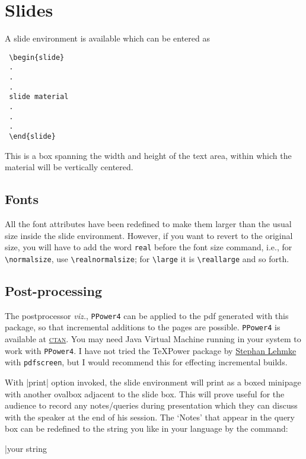 \documentclass[a4paper]{article}
\begin{document}
\section{Slides}

A slide environment is available which can be entered as
\begin{verbatim}
 \begin{slide}
 .
 .
 .
 slide material
 .
 .
 .
 \end{slide}
 \end{verbatim}
This is a box spanning the width and height of the text area, within
which the material will be vertically centered. 

\subsection{Fonts}
All the font attributes have been redefined to make them larger than
the usual size inside the slide environment. However, if you want to
revert to the original size, you will have to add the word \verb+real+
before the font size command, i.e., for \verb+\normalsize+, use
\verb+\realnormalsize+; for \verb+\large+ it is \verb+\reallarge+ and
so forth.

\subsection{Post-processing}

The postprocessor \emph{viz.}, \verb+PPower4+ can be applied to the pdf
generated with this package, so that incremental additions to the pages
are possible. \verb+PPower4+ is available at
\href{ftp://ftp.dante.de/support/PPower4}{\textsc{ctan}}. You may need
Java Virtual Machine running in your system to work with
\verb+PPower4+. I have not tried the \TeX{}Power package by
\href{mailto:Stephan.Lehmke@cs.uni-dortmund.de}{Stephan Lehmke}
with \verb+pdfscreen+, but I would recommend this for effecting
incremental builds.

\begin{print}
With |print| option invoked, the slide environment will print as a
boxed minipage with another ovalbox adjacent to the slide box. This
will prove useful for the audience to record any notes/queries during
presentation which they can discuss with the speaker at the end of his
session. The `Notes' that appear in the query box can be redefined to
the string you like in your language by the command:
\begin{decl}
|\def\notesname|\arg{your string}
\end{decl}
\end{print}
\end{document}
